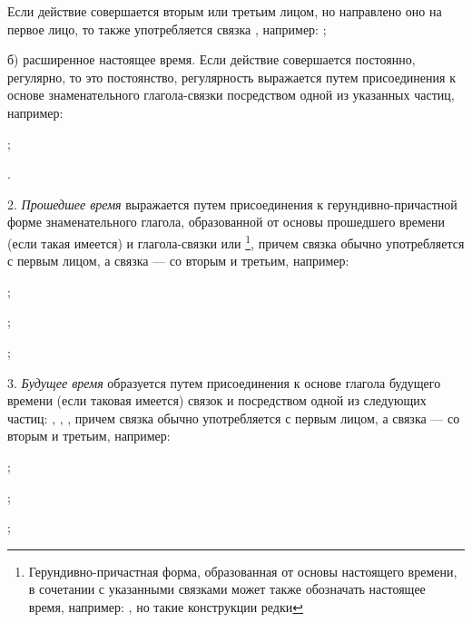 Если действие совершается вторым или третьим лицом, но направлено оно на первое лицо, то также употребляется связка , например:
;

б) расширенное настоящее время. Если действие совершается постоянно, регулярно, то это постоянство, регулярность выражается путем присоединения к основе знаменательного глагола-связки  посредством одной из указанных частиц, например:

\begin{description}
	\item{};
	\item{}.
\end{description}

2. \emph{Прошедшее время} выражается путем присоединения к герундивно-причастной форме знаменательного глагола, образованной от основы прошедшего времени (если такая имеется) и глагола-связки  или \footnote[38]{Герундивно-причастная форма, образованная от основы настоящего времени, в сочетании с указанными связками может также обозначать настоящее время, например: , но такие конструкции редки},
причем связка  обычно употребляется с первым лицом, а связка  --- со вторым и третьим, например:

\begin{description}
	\item{};
	\item{};
	\item{};
\end{description}

3. \emph{Будущее время} образуется путем присоединения к основе глагола будущего времени (если таковая имеется) связок  и  посредством одной из следующих частиц: , , , причем связка
 обычно употребляется с первым лицом, а связка  --- со вторым и третьим, например:
\begin{description}
	\item{};
	\item{};
	\item{};
\end{description}

